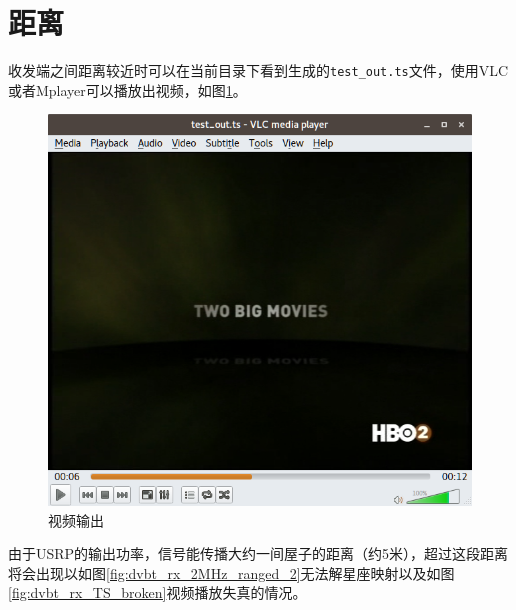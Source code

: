 	\section{距离}
		\par 收发端之间距离较近时可以在当前目录下看到生成的\lstinline[language=sh]{test_out.ts}文件，使用VLC或者Mplayer可以播放出视频，如图\ref{fig:dvbt_rx_TS}。
		\begin{figure}[htp]
			\centering
			\includegraphics[width=13cm]{figures/dvbt_rx_TS.png}
			\caption{视频输出}
			\label{fig:dvbt_rx_TS}
		\end{figure}
		\par 由于USRP的输出功率，信号能传播大约一间屋子的距离（约5米），超过这段距离将会出现以如图\ref{fig:dvbt_rx_2MHz_ranged_2}无法解星座映射以及如图\ref{fig:dvbt_rx_TS_broken}视频播放失真的情况。
		\begin{figure}[htp]
			\centering
			 \\
		\end{figure}
